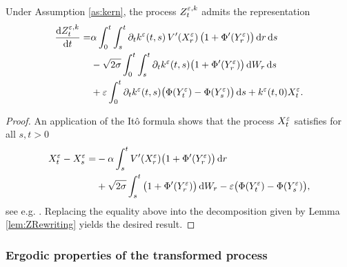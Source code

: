 \documentclass[10pt]{article}
\begin{document}
\begin{lemma}\label{lem:ZExpansion} Under Assumption \ref{as:kern}, the process $Z^{\varepsilon, k}_t$ admits the representation 
\begin{equation}
\begin{aligned}
	\frac{\mathrm{d} Z^{\varepsilon,k}_t}{\mathrm{d} t} = &\alpha \int_0^t\int_s^t \partial_t k^\varepsilon(t, s) \, V'(X^\varepsilon_r)\, \big(1 + \Phi'(Y^\varepsilon_r)\big)\,\mathrm{d} r \,\mathrm{d} s  \\
	&-\sqrt{2\sigma}\int_0^t\int_s^t \partial_t k^\varepsilon(t, s) \big(1 + \Phi'(Y^\varepsilon_r)\big) \,\mathrm{d} W_r \,\mathrm{d} s\\
	&+ \varepsilon \int_0^t \partial_t k^\varepsilon(t, s) \big(\Phi(Y^\varepsilon_t)- \Phi(Y^\varepsilon_s)\big) \,\mathrm{d} s + k^\varepsilon(t, 0) X^\varepsilon_t.
\end{aligned}
\end{equation}
\end{lemma}
\begin{proof} An application of the Itô formula shows that the process $X_t^\varepsilon$ satisfies for all $s, t > 0$
	\begin{equation}
	\begin{aligned}
		X^\varepsilon_t - X^\varepsilon_s = &-\alpha \int_s^t V'(X^\varepsilon_r)\big(1 + \Phi'(Y^\varepsilon_r)\big)\,\mathrm{d} r \\
		&+\sqrt{2\sigma}\int_s^t \big(1 + \Phi'(Y^\varepsilon_r)\big) \,\mathrm{d} W_r -\varepsilon \big(\Phi(Y^\varepsilon_t)- \Phi(Y^\varepsilon_s)\big),
	\end{aligned}
	\end{equation}
	see e.g. \cite[Equation (5.8)]{PaS07}. Replacing the equality above into the decomposition given by Lemma \ref{lem:ZRewriting} yields the desired result.
\end{proof}

\subsubsection{Ergodic properties of the transformed process}\label{sec:Ergodic}
\end{document}
